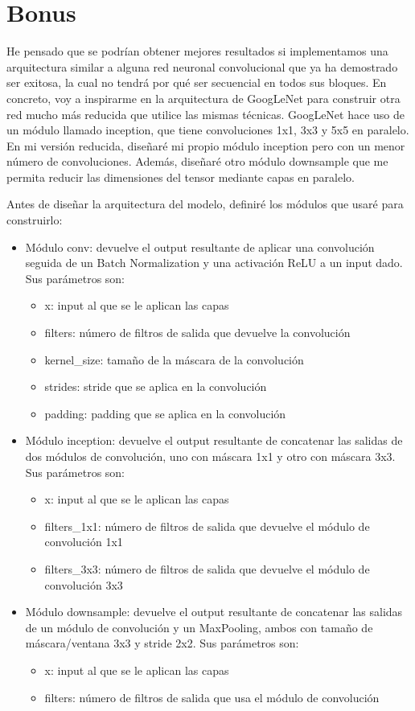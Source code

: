 \documentclass[10pt,a4paper]{article}
\begin{document}
\newpage

\section{Bonus}

He pensado que se podrían obtener mejores resultados si implementamos una arquitectura similar a alguna red neuronal convolucional que ya ha demostrado ser exitosa, la cual no tendrá por qué ser secuencial en todos sus bloques. En concreto, voy a inspirarme en la arquitectura de GoogLeNet para construir otra red mucho más reducida que utilice las mismas técnicas. GoogLeNet hace uso de un módulo llamado inception, que tiene convoluciones 1x1, 3x3 y 5x5 en paralelo. En mi versión reducida, diseñaré mi propio módulo inception pero con un menor número de convoluciones. Además, diseñaré otro módulo downsample que me permita reducir las dimensiones del tensor mediante capas en paralelo.

Antes de diseñar la arquitectura del modelo, definiré los módulos que usaré para construirlo:

\begin{itemize}
\item Módulo conv: devuelve el output resultante de aplicar una convolución seguida de un Batch Normalization y una activación ReLU a un input dado. Sus parámetros son:
	\begin{itemize}
	\item x: input al que se le aplican las capas
	\item filters: número de filtros de salida que devuelve la convolución
	\item kernel\_size: tamaño de la máscara de la convolución
	\item strides: stride que se aplica en la convolución
	\item padding: padding que se aplica en la convolución
	\end{itemize}
\item Módulo inception: devuelve el output resultante de concatenar las salidas de dos módulos de convolución, uno con máscara 1x1 y otro con máscara 3x3. Sus parámetros son:
	\begin{itemize}
	\item x: input al que se le aplican las capas
	\item filters\_1x1: número de filtros de salida que devuelve el módulo de convolución 1x1
	\item filters\_3x3: número de filtros de salida que devuelve el módulo de convolución 3x3
	\end{itemize}
\item Módulo downsample: devuelve el output resultante de concatenar las salidas de un módulo de convolución y un MaxPooling, ambos con tamaño de máscara/ventana 3x3 y stride 2x2. Sus parámetros son:
	\begin{itemize}
	\item x: input al que se le aplican las capas
	\item filters: número de filtros de salida que usa el módulo de convolución
	\end{itemize}
\end{itemize}
\end{document}
